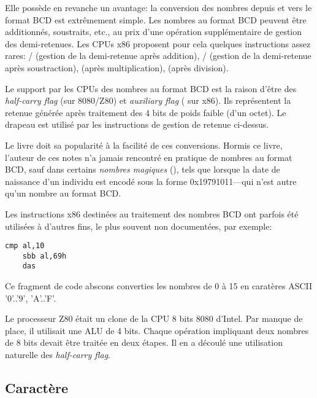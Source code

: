 Elle possède en revanche un avantage: la conversion des nombres depuis et vers le format \ac{BCD} est extrêmement simple.
Les nombres au format BCD peuvent être additionnés, soustraits, etc., au prix d'une opération supplémentaire de gestion des demi-retenues.
Les CPUs x86 proposent pour cela quelques instructions assez rares:
/ (gestion de la demi-retenue après addition),
/ (gestion de la demi-retenue après soustraction),
 (après multiplication),
 (après division).

Le support par les CPUs des nombres au format \ac{BCD} est la raison d'être des \emph{half-carry flag} (sur 8080/Z80) et
\emph{auxiliary flag} ( sur x86).
Ils représentent la retenue générée après traitement des 4 bits de poids faible (d'un octet).
Le drapeau est utilisé par les instructions de gestion de retenue ci-dessus.

Le livre  doit sa popularité à la facilité de ces conversions.
Hormis ce livre, l'auteur de ces notes n'a jamais rencontré en pratique de nombres au format \ac{BCD}, sauf dans certains
\emph{nombres magiques} (),
tels que lorsque la date de naissance d'un individu est encodé sous la forme 0x19791011---qui n'est autre qu'un nombre au format \ac{BCD}.

Les instructions x86 destinées au traitement des nombres \ac{BCD} ont parfois été utilisées à d'autres fins, le plus souvent non documentées, par exemple:

\begin{lstlisting}[style=customasmx86]
	cmp al,10
	sbb al,69h
	das
\end{lstlisting}

Ce fragment de code abscons converties les nombres de 0 à 15 en caratères \ac{ASCII} '0'..'9', 'A'..'F'.


Le processeur Z80 était un clone de la CPU 8 bits 8080 d'Intel. Par manque de place, il utilisait une \ac{ALU} de 4 bits.
Chaque opération impliquant deux nombres de 8 bits devait être traitée en deux étapes.
Il en a découlé une utilisation naturelle des \emph{half-carry flag}.

\subsection{Caractère}

